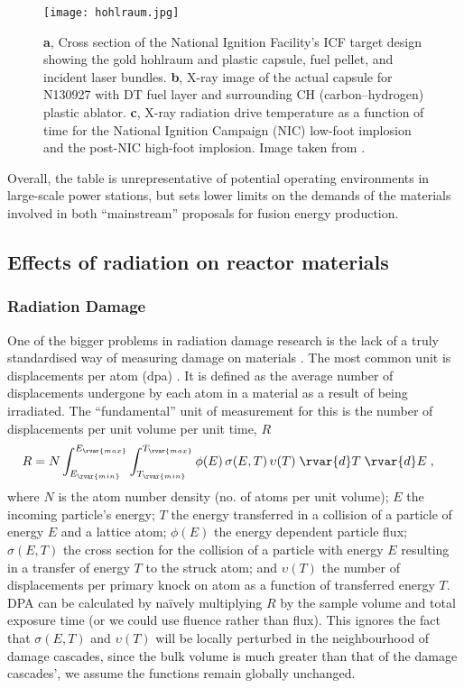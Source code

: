 \begin{figure}[t]
    \centering
    \texttt{[image: hohlraum.jpg]}
    \caption[Hohlraum design for indirect drive in Inertial Confinement Fusion.]{\textbf{a}, Cross section of the National Ignition Facility's ICF target design showing the gold hohlraum and plastic capsule, fuel pellet, and incident laser bundles. \textbf{b}, X-ray image of the actual capsule for N130927 with DT fuel layer and surrounding CH (carbon–hydrogen) plastic ablator. \textbf{c}, X-ray radiation drive temperature as a function of time for the National Ignition Campaign (NIC) low-foot implosion and the post-NIC high-foot implosion. Image taken from \cite{hohlraum}.}
    \label{f:hohlraum}
\end{figure}

Overall, the table is unrepresentative of potential operating environments in large-scale power stations, but sets lower limits on the demands of the materials involved in both ``mainstream'' proposals for fusion energy production.

\subsection{Effects of radiation on reactor materials}
\label{ss:rad_effect_mat}
\subsubsection{Radiation Damage}
\label{sss:rad_damage}
One of the bigger problems in radiation damage research is the lack of a truly standardised way of measuring damage on materials \cite{srimisbad}. The most common unit is displacements per atom (dpa) \cite{dpa}. It is defined as the average number of displacements undergone by each atom in a material as a result of being irradiated. The ``fundamental'' unit of measurement for this is the number of displacements per unit volume per unit time, $R$
\begin{align}
    R & = N\int _{E_{\rvar{min}}}^{E_{\rvar{max}}}\int _{T_{\rvar{min}}}^{T_{\rvar{max}}}\phi (E)\,\sigma (E,T)\,\upsilon (T)\;\rvar{d}T\;\rvar{d}E\;,
\end{align}
where $ N $ is the atom number density (no. of atoms per unit volume); $ E $ the incoming particle's energy; $ T $ the energy transferred in a collision of a particle of energy $E$ and a lattice atom; $ \phi(E) $ the energy dependent particle flux; $ \sigma(E,T) $ the cross section for the collision of a particle with energy $ E $ resulting in a transfer of energy $ T $ to the struck atom; and $ \upsilon(T) $ the number of displacements per primary knock on atom as a function of transferred energy $ T $. DPA can be calculated by na\"{i}vely multiplying $ R $ by the sample volume and total exposure time (or we could use fluence rather than flux). This ignores the fact that $\sigma (E,T)$ and $\upsilon (T)$ will be locally perturbed in the neighbourhood of damage cascades, since the bulk volume is much greater than that of the damage cascades', we assume the functions remain globally unchanged.

